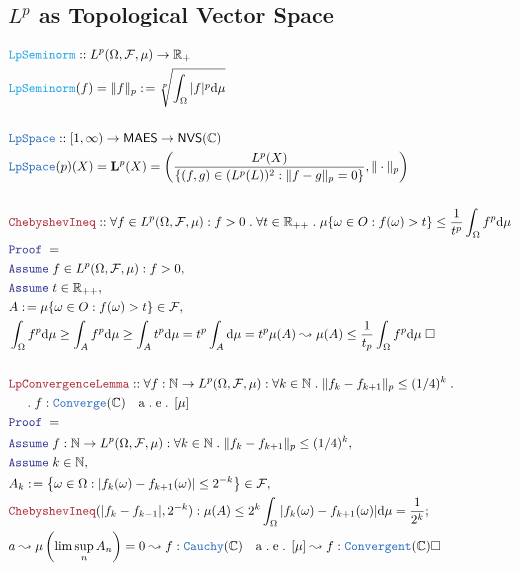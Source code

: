 \documentclass[12pt]{article}
\newcommand{\TYPE}[1]{\textcolor{NavyBlue}{\mathtt{#1}}}
\newcommand{\FUNC}[1]{\textcolor{Cerulean}{\mathtt{#1}}}
\newcommand{\LOGIC}[1]{\textcolor{Blue}{\mathtt{#1}}}
\newcommand{\THM}[1]{\textcolor{Maroon}{\mathtt{#1}}}
\renewcommand{\.}{\; . \;}
\newcommand{\de}{: \kern 0.1pc =}
\newcommand{\NewLine}{\\ & \kern 1pc}
\newcommand{\Reals}{\mathbb{R} }
\newcommand{\Nat}{\mathbb{N} }
\newcommand{\Co}{\mathbb{C} }
\newcommand{\A}{\LOGIC{Assume} \;}
\newcommand{\QED}{\; \square}
\newcommand{\Proof}{\LOGIC{Proof} \; }
\renewcommand{\AE}[1]{\mathrm{a\. e\.} \left[#1\right]}
\newcommand{\F}{\mathcal{F}}
\renewcommand{\O}{\Omega}
\newcommand{\Lp}{\mathbf{L}}
\begin{document}
\subsection{$L^p$ as Topological Vector Space}
\begin{align*}
&\FUNC{LpSeminorm} :: L^p(\O,\F,\mu) \to \Reals_+ \\
&\FUNC{LpSeminorm}(f) = \| f \|_p \de \sqrt[p]{\int_\O |f|^p\mathrm{d}\mu}  
\\ \\
&\TYPE{LpSpace} ::  [1,\infty) \to \mathsf{MAES} \to \mathsf{NVS}(\Co)
\\
& \TYPE{LpSpace}(p)(X) =  \Lp^p(X) = \left (\frac{L^p(X)}{\{ (f,g) \in
 (L^p(L))^2 : \| f - g \|_p = 0 \}}      , \| \cdot \|_p\right )  
 \\ \\ 
& \THM{ChebyshevIneq}  ::  \forall f \in L^p(\O,\F,\mu) : f > 0 \. \forall t \in \Reals_{++} \.
   \mu\{ \omega \in O : f(\omega) > t \} \le \frac{1}{t^p} \int_\O f^p \mathrm{d}\mu        \\    
& \Proof = \\
&  \A f \in  L^p(\O,\F,\mu) : f > 0,    \\
&  \A t \in \Reals_{++}, \\
&  A \de \mu\{ \omega \in O : f(\omega) > t \} \in \F, \\
&  \int_\O f^p \mathrm{d}\mu \ge \int_A f^p \mathrm{d}\mu \ge \int_A t^p \mathrm{d}\mu  =
t^p\int_A\mathrm{d}\mu = t^p\mu(A) \leadsto  \mu(A) \le \frac{1}{t_p}\int_\O f^p\mathrm{d}\mu \QED      
\\ \\
&\THM{LpConvergenceLemma} :: \forall f : \Nat \to L^p(\O,\F,\mu)  : \forall k \in \Nat \.
 \| f_k - f_{k+1} \|_p  \le (1/4)^k 
 \.
\NewLine \.
   f : \TYPE{Converge}(\Co) \quad \AE{\mu} \\
&  \Proof =  \\
& \A f : \Nat \to L^p(\O,\F,\mu) :   \forall k \in \Nat \.
 \| f_k - f_{k+1} \|_p \le (1/4)^k ,        \\
&   \A k \in \Nat,               \\
&  A_k \de \left  \{ \omega \in \O : |f_k(\omega) - f_{k +1}(\omega)| \le 2^{-k} \right  \} \in \F, \\
&  \THM{ChebyshevIneq}(|f_k - f_{k-1}|, 2^{-k}) : \mu(A) \le 2^k\int_\O |f_k(\omega) -f_{k + 1}(\omega)|\mathrm{d}\mu  = \frac{1}{2^k} ;              \\
&  a \leadsto  \mu \left (\lim \sup_n A_n \right ) = 0 \leadsto f : \TYPE{Cauchy}(\Co) \quad \AE{\mu} \leadsto f : \TYPE{Convergent}(\Co)  \square          

\end{align*}
\end{document}
